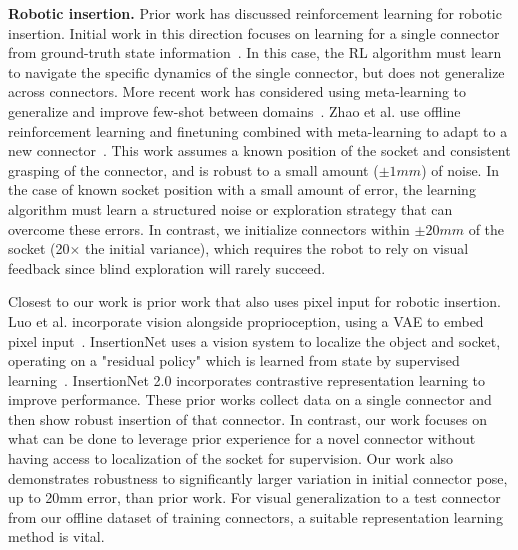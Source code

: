 \textbf{Robotic insertion.} Prior work has discussed reinforcement learning for robotic insertion.
Initial work in this direction focuses on learning
for a single connector from ground-truth state information~\cite{lian2021insertionbenchmark, johannink18residualrl, schoettler2019insertion}.
In this case, the RL algorithm must learn to navigate the specific dynamics of the single connector, but does not generalize across connectors.
More recent work has considered using meta-learning to generalize and improve few-shot between domains~\cite{Schoettler2020}.
Zhao et al. use offline reinforcement learning and finetuning combined with  meta-learning to adapt to a new connector~\cite{zhao2022insertion}.
This work assumes a known position of the socket and consistent grasping of the connector, and is robust to a small amount ($\pm1mm$) of noise.
In the case of known socket position with a small amount of error, the learning algorithm must learn a structured noise or exploration strategy that can overcome these errors.
In contrast, we initialize connectors within $\pm20mm$ of the socket (20$\times$ the initial variance), which requires the robot to rely on visual feedback since blind exploration will rarely succeed.

Closest to our work is prior work that also uses pixel input for robotic insertion.
Luo et al. incorporate vision alongside proprioception, using a VAE to embed pixel input~\cite{luo2021insertion}.
InsertionNet uses a vision system to localize the object and socket, operating on a "residual policy" which is learned from state by supervised learning~\cite{spector2021insertionnet}.
InsertionNet 2.0 incorporates contrastive representation learning to improve performance.
These prior works collect data on a single connector and then show robust insertion of that connector.
In contrast, our work focuses on what can be done to leverage prior experience for a novel connector without having access to localization of the socket for supervision.
Our work also demonstrates robustness to significantly larger variation in initial connector pose, up to 20mm error, than prior work.
For visual generalization to a test connector from our offline dataset of \numconnectors{} training connectors, a suitable representation learning method is vital.


